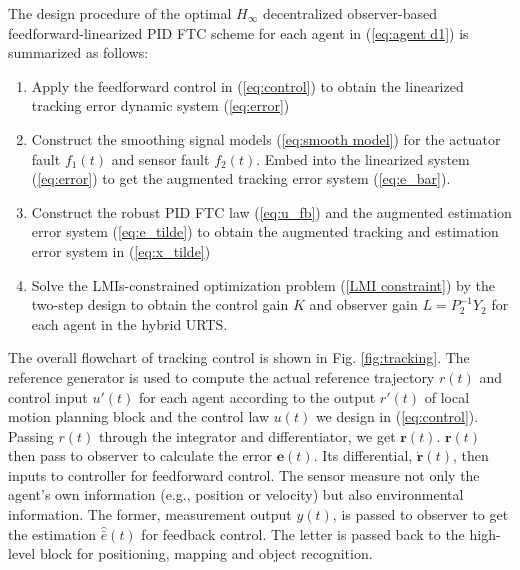 \documentclass{ieeeaccess}
\begin{document}
The design procedure of the optimal $H_\infty$ decentralized observer-based feedforward-linearized PID FTC scheme for each agent in (\ref{eq:agent d1}) is summarized as follows:
\begin{enumerate}
    \item Apply the feedforward control in (\ref{eq:control}) to obtain the linearized tracking error dynamic system (\ref{eq:error})
    \item Construct the smoothing signal models (\ref{eq:smooth model}) for the actuator fault $f_1(t)$ and sensor fault $f_2(t)$. Embed into the linearized system (\ref{eq:error}) to get the augmented tracking error system (\ref{eq:e_bar}).
    \item Construct the robust PID FTC law (\ref{eq:u_fb}) and the augmented estimation error system (\ref{eq:e_tilde}) to obtain the augmented tracking and estimation error system in (\ref{eq:x_tilde})
    \item Solve the LMIs-constrained optimization problem (\ref{LMI constraint}) by the two-step design to obtain the control gain $K$ and observer gain $L=P_2^{-1}Y_2$ for each agent in the hybrid URTS.
\end{enumerate}

The overall flowchart of tracking control is shown in Fig. \ref{fig:tracking}. The reference generator is used to compute the actual reference trajectory $r(t)$ and control input $u'(t)$ for each agent according to the output $r'(t)$ of local motion planning block and the control law $u(t)$ we design in (\ref{eq:control}). Passing $r(t)$ through the integrator and differentiator, we get $\pmb{r}(t)$. $\pmb{r}(t)$ then pass to observer to calculate the error $\pmb{e}(t)$. Its differential, $\dot{\pmb{r}}(t)$, then inputs to controller for feedforward control. The sensor measure not only the agent's own information (e.g., position or velocity) but also environmental information. The former, measurement output $y(t)$, is passed to observer to get the estimation $\hat{\bar{e}}(t)$ for feedback control. The letter is passed back to the high-level block for positioning, mapping and object recognition.
\end{document}
